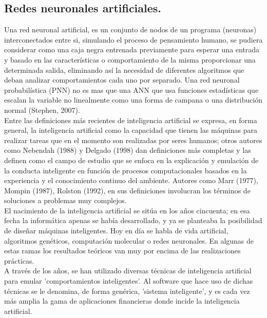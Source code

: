 \subsection{Redes neuronales artificiales.}

Una red neuronal artificial,  es un conjunto de nodos de un programa (neuronas) interconectados entre si, simulando el proceso de pensamiento humano, se pudiera considerar como una caja negra entrenada previamente para esperar una entrada y basado en las características o comportamiento de la misma proporcionar una determinada salida, eliminando así la necesidad de diferentes algoritmos que deban analizar comportamientos cada uno por separado. Una red neuronal probabilística (PNN) no es mas que una ANN que usa funciones estadísticas que escalan la variable no linealmente como una forma de campana o una distribución normal (Stephen, 2007).\\

Entre las definiciones más recientes de inteligencia artificial se expresa, en forma general, la inteligencia artificial como la capacidad que tienen las máquinas para realizar tareas que en el momento son realizadas por seres humanos; otros autores como Nebendah (1988) y Delgado (1998) dan definiciones más completas y las definen como el campo de estudio que se enfoca en la explicación y emulación de la conducta inteligente en función de procesos computacionales basados en la experiencia y el conocimiento continuo del ambiente. Autores como Marr (1977), Mompin (1987), Rolston (1992), en sus definiciones involucran los términos de soluciones a problemas muy complejos.\\

El nacimiento de la inteligencia artificial se sitúa en los años cincuenta; en esa fecha la informática apenas se había desarrollado, y ya se planteaba la posibilidad de diseñar máquinas inteligentes. Hoy en día se habla de vida artificial, algoritmos genéticos, computación molecular o redes neuronales. En algunas de estas ramas los resultados teóricos van muy por encima de las realizaciones prácticas.\\

A través de los años, se han utilizado diversas técnicas de inteligencia artificial para emular 'comportamientos inteligentes'. Al software que hace uso de dichas técnicas se le denomina, de forma genérica, 'sistema inteligente', y es cada vez más amplia la gama de aplicaciones financieras donde incide la inteligencia artificial.\\

